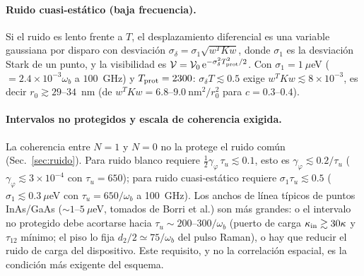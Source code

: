 \documentclass[11pt,a4paper]{article}
\newcommand{\ee}{\mathrm{e}}
\newcommand{\wb}{\omega_b}
\newcommand{\gphi}{\gamma_\varphi}
\begin{document}
\paragraph{Ruido cuasi-estático (baja frecuencia).}
Si el ruido es lento frente a $T$, el desplazamiento diferencial es una variable gaussiana por disparo con desviación $\sigma_\delta=\sigma_1\sqrt{w^TKw}$, donde $\sigma_1$ es la desviación Stark de un punto, y la visibilidad es
$\mathcal V=\mathcal V_0\,\ee^{-\sigma_\delta^2T_{\rm prot}^2/2}$. Con $\sigma_1=1~\mu$eV ($=2.4\times10^{-3}\wb$ a $100$~GHz) y $T_{\rm prot}=2300$: $\sigma_\delta T\lesssim0.5$ exige $w^TKw\lesssim8\times10^{-3}$, es decir
$r_0\gtrsim29$--$34$~nm (de $w^TKw=6.8$--$9.0\ \mathrm{nm}^2/r_0^2$ para $c=0.3$--$0.4$).

\paragraph{Intervalos no protegidos y escala de coherencia exigida.}
La coherencia entre $N=1$ y $N=0$ no la protege el ruido común (Sec.~\ref{sec:ruido}). Para ruido blanco requiere $\tfrac12\gphi\,\tau_u\lesssim0.1$, esto es $\gphi\lesssim0.2/\tau_u$ ($\gphi\lesssim3\times10^{-4}$ con $\tau_u=650$);
para ruido cuasi-estático requiere $\sigma_1\tau_u\lesssim0.5$ ($\sigma_1\lesssim0.3~\mu$eV con $\tau_u=650/\wb$ a 100~GHz).
Los anchos de línea típicos de puntos InAs/GaAs ($\sim1$--$5~\mu$eV, tomados de Borri et al.) son más grandes: o el intervalo no protegido debe acortarse hacia $\tau_u\sim200$--$300/\wb$ (puerto de carga $\kappa_{\rm in}\gtrsim30\kappa$ y $\tau_{12}$ mínimo; el piso lo fija $d_2/2\simeq75/\wb$ del pulso Raman), o hay que reducir el ruido de carga del dispositivo.
Este requisito, y no la correlación espacial, es la condición más exigente del esquema.

\end{document}
